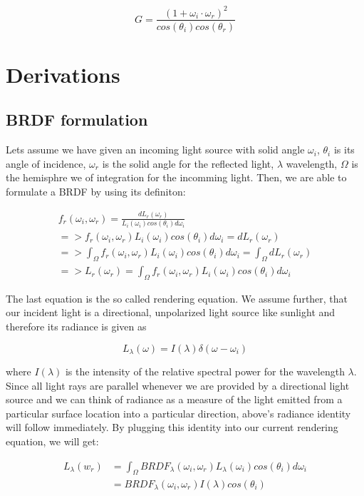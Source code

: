 \begin{equation}
  G =\frac{(1 + \omega_i \cdot \omega_r)^2}{cos(\theta_i)cos(\theta_r)}
\label{eq:geometricterm}
\end{equation}

\section{Derivations}
\subsection{BRDF formulation}
Lets assume we have given an incoming light source with solid angle $\omega_i$, $\theta{_i}$ is its angle of incidence, $\omega_r$ is the solid angle for the reflected light, $\lambda$ wavelength, $\Omega$ is the hemisphre we of integration for the incomming light. Then, we are able to formulate a BRDF by using its definiton:  

\begin{align*}
f_r(\omega_i, \omega_r) = \frac{dL_r(\omega_r)}{L_i(\omega_i)cos(\theta_i)d\omega_i} \\
=> f_r(\omega_i, \omega_r) L_i(\omega_i)cos(\theta_i)d\omega_i = dL_r(\omega_r) \\
=> \int_{\Omega}f_r(\omega_i, \omega_r) L_i(\omega_i)cos(\theta_i)d\omega_i = \int_{\Omega}dL_r(\omega_r) \\
=> L_r(\omega_r) = \int_{\Omega}f_r(\omega_i, \omega_r) L_i(\omega_i)cos(\theta_i)d\omega_i
\end{align*}

The last equation is the so called rendering equation.
We assume further, that our incident light is a directional, unpolarized light source like sunlight and therefore its radiance is given as 

\begin{equation}
 L_{\lambda}(\omega)=I(\lambda)\delta(\omega-\omega_i)
\end{equation}

where $I(\lambda)$ is the intensity of the relative spectral power for the wavelength $\lambda$. 
Since all light rays are parallel whenever we are provided by a directional light source and we can think of radiance as a measure of the light emitted from a particular surface location into a particular direction, above's radiance identity will follow immediately. 
By plugging this identity into our current rendering equation, we will get:

\begin{align}
L_{\lambda}(w_r) 
& = \int_{\Omega} BRDF_{\lambda}(\omega_i, \omega_r) L_{\lambda}(\omega_i) cos(\theta_i) d\omega_i \\
& = BRDF_{\lambda}(\omega_i, \omega_r) I(\lambda) cos(\theta_i)
\end{align}

